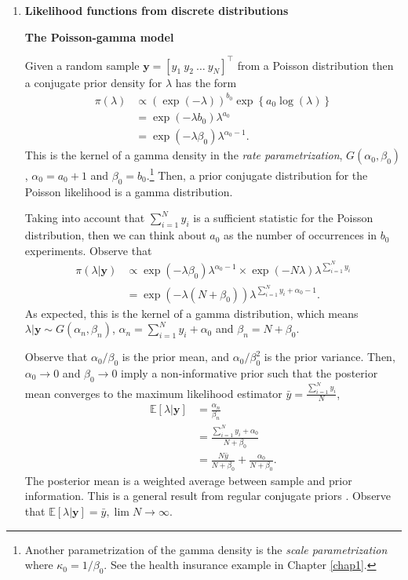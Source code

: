 \begin{enumerate}
	\item \textbf{Likelihood functions from discrete distributions}

\textbf{The Poisson-gamma model}

Given a random sample $\bm{y}=[y_1 \ y_2 \ \dots \ y_N]^{\top}$ from a Poisson distribution then a conjugate prior density for $\lambda$ has the form 
\begin{align}
	\pi(\lambda)&\propto \left(\exp(-\lambda)\right)^{b_0} \exp\left\{a_0\log(\lambda)\right\}\nonumber\\
	& = \exp(-\lambda b_0) \lambda^{a_0}\nonumber\\
	& = \exp(-\lambda \beta_0) \lambda^{\alpha_0-1}.\nonumber
\end{align}
This is the kernel of a gamma density in the \textit{rate parametrization}, $G(\alpha_0,\beta_0)$, $\alpha_0=a_0+1$ and $\beta_0=b_0$.\footnote{Another parametrization of the gamma density is the \textit{scale parametrization} where $\kappa_0=1/\beta_0$. See the health insurance example in Chapter \ref{chap1}.} Then, a prior conjugate distribution for the Poisson likelihood is a gamma distribution.   

Taking into account that $\sum_{i=1}^N y_i$ is a sufficient statistic for the Poisson distribution, then we can think about $a_0$ as the number of occurrences in $b_0$ experiments. 
Observe that
\begin{align}
	\pi(\lambda|\bm{y})&\propto \exp(-\lambda \beta_0) \lambda^{\alpha_0-1} \times \exp(-N\lambda)\lambda^{\sum_{i=1}^Ny_i}\nonumber\\
	&= \exp(-\lambda(N+\beta_0)) \lambda^{\sum_{i=1}^Ny_i+\alpha_0-1}.\nonumber 
\end{align}
As expected, this is the kernel of a gamma distribution, which means $\lambda|\bm{y}\sim G(\alpha_n,\beta_n)$, $\alpha_n=\sum_{i=1}^Ny_i+\alpha_0$ and $\beta_n=N+\beta_0$.

Observe that $\alpha_0/\beta_0$ is the prior mean, and $\alpha_0/\beta_0^2$ is the prior variance. Then, $\alpha_0\rightarrow 0$ and $\beta_0\rightarrow 0$ imply a non-informative prior such that the posterior mean converges to the maximum likelihood estimator $\bar{y}=\frac{\sum_{i=1}^N y_i}{N}$,
\begin{align}
	\mathbb{E}\left[\lambda|\bm{y}\right]&=\frac{\alpha_n}{\beta_n}\nonumber\\
	&=\frac{\sum_{i=1}^Ny_i+\alpha_0}{N+\beta_0}\nonumber\\
	&=\frac{N\bar{y}}{N+\beta_0}+\frac{\alpha_0}{N+\beta_0}.\nonumber
\end{align}
The posterior mean is a weighted average between sample and prior information. This is a general result from regular conjugate priors \cite{diaconis1979conjugate}. Observe that $\mathbb{E}\left[\lambda|\bm{y}\right]=\bar{y}, \lim N\rightarrow\infty$. 


\end{enumerate}
